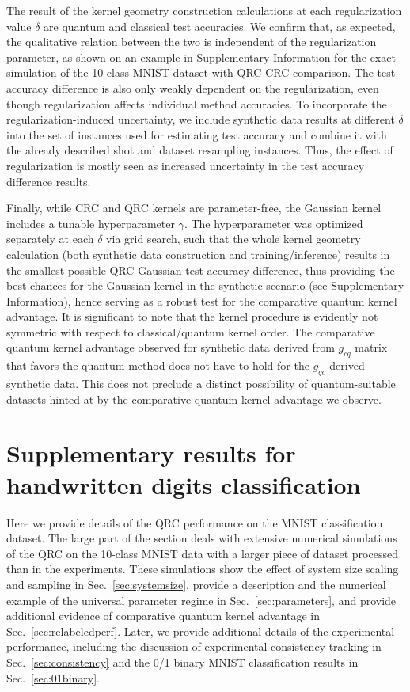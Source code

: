\documentclass[english,floatfix,twocolumn,showpacs, aps, prx, reprint, superscriptaddress, longbibliography]{revtex4-2}
\begin{document}
The result of the kernel geometry construction calculations at each regularization value $\delta$ are quantum and classical test accuracies. We confirm that, as expected, the qualitative relation between the two is independent of the regularization parameter, as shown on an example in Supplementary Information for the exact simulation of the 10-class MNIST dataset with QRC-CRC comparison. The test accuracy difference is also only weakly dependent on the regularization, even though regularization affects individual method accuracies. To incorporate the regularization-induced uncertainty, we include synthetic data results at different $\delta$ into the set of instances used for estimating test accuracy and combine it with the already described shot and dataset resampling instances. Thus, the effect of regularization is mostly seen as increased uncertainty in the test accuracy difference results.

Finally, while CRC and QRC kernels are parameter-free, the Gaussian kernel includes a tunable hyperparameter $\gamma$. The hyperparameter was optimized separately at each $\delta$ via grid search, such that the whole kernel geometry calculation (both synthetic data construction and training/inference) results in the smallest possible QRC-Gaussian test accuracy difference, thus providing the best chances for the Gaussian kernel in the synthetic scenario (see Supplementary Information), hence serving as a robust test for the comparative quantum kernel advantage. It is significant to note that the kernel procedure is evidently not symmetric with respect to classical/quantum kernel order. The comparative quantum kernel advantage observed for synthetic data derived from $g_{cq}$ matrix that favors the quantum method does not have to hold for the $g_{qc}$ derived synthetic data. This does not preclude a distinct possibility of quantum-suitable datasets hinted at by the comparative quantum kernel advantage we observe.

\section{Supplementary results for handwritten digits classification}
\label{sec:MNIST}

Here we provide details of the QRC performance on the MNIST classification dataset. The large part of the section deals with extensive numerical simulations of the QRC on the 10-class MNIST data with a larger piece of dataset processed than in the experiments. These simulations show the effect of system size scaling and sampling in Sec.~\ref{sec:systemsize}, provide a description and the numerical example of the universal parameter regime in Sec.~\ref{sec:parameters}, and provide additional evidence of comparative quantum kernel advantage in Sec.~\ref{sec:relabeledperf}. Later, we provide additional details of the experimental performance, including the discussion of experimental consistency tracking in Sec.~\ref{sec:consistency} and the 0/1 binary MNIST classification results in Sec.~\ref{sec:01binary}. 
\end{document}

